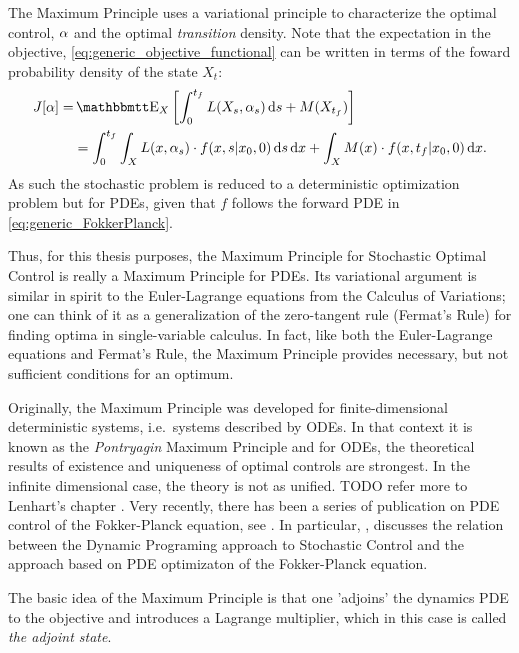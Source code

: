 \vskip 10pt
The Maximum Principle uses a variational principle to characterize the optimal
control, $\alpha$ and the optimal {\sl transition } density. Note that the
expectation in the objective, \cref{eq:generic_objective_functional} can be written in terms of the foward
probability density of the state $X_t$:
\begin{align}
J[\a] =&  \Exp_X \left[ \int_0^\tf L(X_s, \a_s) \intd{s} + M(X_\tf) \right]
\notag \\
&=  \int_0^\tf\int_X L(x, \a_s) \cdot f(x,s|x_0,0) \intd{s}\intd{x} 
+ \int_X  M(x)\cdot f(x,\tf|x_0,0)\intd{x}.
\label{eq:generic_objective_functional_in_terms_of_forward_density}
\end{align}
As such the stochastic problem is reduced to a deterministic optimization
problem but for PDEs, given that $f$ follows the forward PDE in
\cref{eq:generic_FokkerPlanck}. 

Thus, for this thesis purposes, the Maximum Principle for Stochastic Optimal
Control is really a Maximum Principle for PDEs. Its variational argument is
similar in spirit to the Euler-Lagrange equations from the Calculus of
Variations; one can think of it as a generalization of the zero-tangent
rule (Fermat's Rule) for finding optima in single-variable calculus. In fact,
like both the Euler-Lagrange equations and Fermat's Rule, the Maximum Principle
provides necessary, but not sufficient conditions for an optimum.

Originally, the Maximum Principle was developed for finite-dimensional
deterministic systems, i.e.\ systems described by ODEs. In that context it is
known as the {\sl Pontryagin} Maximum Principle and for ODEs, the theoretical
results of existence and uniqueness of optimal controls are strongest. In the
infinite dimensional case, the theory is not as unified. TODO refer
more to Lenhart's chapter \cite{Lenhart2007}. Very recently, there has been a
series of publication on PDE control of the Fokker-Planck equation, see
\cite{Annunziato2010,Annunziato2013,Annunziato2014}. In particular,
\cite{Annunziato2014}, discusses the relation between the Dynamic Programing
approach to Stochastic Control and the approach based on PDE optimizaton of the 
Fokker-Planck equation.

The basic idea of the Maximum Principle is that one 'adjoins' the dynamics PDE
to the objective and introduces a Lagrange multiplier, which in this case is
called {\sl the adjoint state}.

